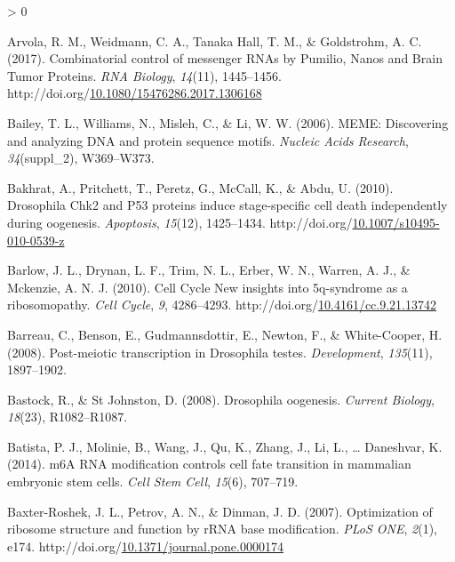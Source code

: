 \documentclass[12pt,oneside]{reedthesis}
\newlength{\cslhangindent}
\newenvironment{CSLReferences}[2] %
 {%
  \setlength{\parindent}{0pt}
  \ifodd #1 \everypar{\setlength{\hangindent}{\cslhangindent}}\ignorespaces\fi
  \ifnum #2 > 0
  \setlength{\parskip}{#2\baselineskip}
  \fi
 }%
 {}
\begin{document}
\begin{CSLReferences}{1}{0}
\leavevmode\hypertarget{ref-Arvola2017n}{}%
Arvola, R. M., Weidmann, C. A., Tanaka Hall, T. M., \& Goldstrohm, A. C. (2017). Combinatorial control of messenger {RNAs} by {Pumilio}, {Nanos} and {Brain Tumor Proteins}. \emph{RNA Biology}, \emph{14}(11), 1445--1456. http://doi.org/\href{https://doi.org/10.1080/15476286.2017.1306168}{10.1080/15476286.2017.1306168}

\leavevmode\hypertarget{ref-Bailey2006a}{}%
Bailey, T. L., Williams, N., Misleh, C., \& Li, W. W. (2006). {MEME}: Discovering and analyzing {DNA} and protein sequence motifs. \emph{Nucleic Acids Research}, \emph{34}(suppl\_2), W369--W373.

\leavevmode\hypertarget{ref-bakhratDrosophilaChk2P532010}{}%
Bakhrat, A., Pritchett, T., Peretz, G., McCall, K., \& Abdu, U. (2010). Drosophila {Chk2} and P53 proteins induce stage-specific cell death independently during oogenesis. \emph{Apoptosis}, \emph{15}(12), 1425--1434. http://doi.org/\href{https://doi.org/10.1007/s10495-010-0539-z}{10.1007/s10495-010-0539-z}

\leavevmode\hypertarget{ref-Barlow2010a}{}%
Barlow, J. L., Drynan, L. F., Trim, N. L., Erber, W. N., Warren, A. J., \& Mckenzie, A. N. J. (2010). Cell {Cycle New} insights into 5q-syndrome as a ribosomopathy. \emph{Cell Cycle}, \emph{9}, 4286--4293. http://doi.org/\href{https://doi.org/10.4161/cc.9.21.13742}{10.4161/cc.9.21.13742}

\leavevmode\hypertarget{ref-Barreau2008d}{}%
Barreau, C., Benson, E., Gudmannsdottir, E., Newton, F., \& White-Cooper, H. (2008). Post-meiotic transcription in {Drosophila} testes. \emph{Development}, \emph{135}(11), 1897--1902.

\leavevmode\hypertarget{ref-bastock2008drosophila}{}%
Bastock, R., \& St Johnston, D. (2008). Drosophila oogenesis. \emph{Current Biology}, \emph{18}(23), R1082--R1087.

\leavevmode\hypertarget{ref-Batista2014}{}%
Batista, P. J., Molinie, B., Wang, J., Qu, K., Zhang, J., Li, L., \ldots{} Daneshvar, K. (2014). {m6A RNA} modification controls cell fate transition in mammalian embryonic stem cells. \emph{Cell Stem Cell}, \emph{15}(6), 707--719.

\leavevmode\hypertarget{ref-Baxter-Roshek2007f}{}%
Baxter-Roshek, J. L., Petrov, A. N., \& Dinman, J. D. (2007). Optimization of ribosome structure and function by {rRNA} base modification. \emph{PLoS ONE}, \emph{2}(1), e174. http://doi.org/\href{https://doi.org/10.1371/journal.pone.0000174}{10.1371/journal.pone.0000174}


\end{CSLReferences}
\end{document}
